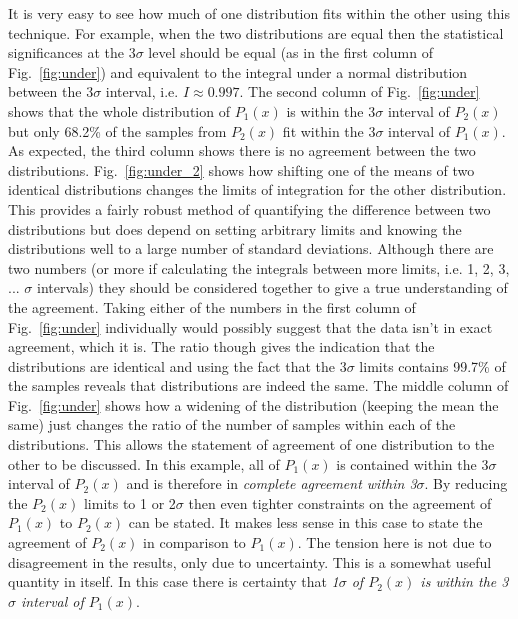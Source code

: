 \documentclass[twocolumn]{revtex4-1}
\begin{document}
    \noindent It is very easy to see how much of one distribution fits within the other using this technique.
    For example, when the two distributions are equal then the statistical significances at the 3$\sigma$ level should be equal (as in the first column of Fig.~\ref{fig:under}) and equivalent to the integral under a normal distribution between the 3$\sigma$ interval, i.e. $I\approx0.997$.
    The second column of Fig.~\ref{fig:under} shows that the whole distribution of $P_1(x)$ is within the 3$\sigma$ interval of $P_2(x)$ but only 68.2\% of the samples from $P_2(x)$ fit within the 3$\sigma$ interval of $P_1(x)$.
    As expected, the third column shows there is no agreement between the two distributions.
    Fig.~\ref{fig:under_2} shows how shifting one of the means of two identical distributions changes the limits of integration for the other distribution.
    This provides a fairly robust method of quantifying the difference between two distributions but does depend on setting arbitrary limits and knowing the distributions well to a large number of standard deviations.
    Although there are two numbers (or more if calculating the integrals between more limits, i.e. 1, 2, 3, ... $\sigma$ intervals) they should be considered together to give a true understanding of the agreement.
    Taking either of the numbers in the first column of Fig.~\ref{fig:under} individually would possibly suggest that the data isn't in exact agreement, which it is.
    The ratio though gives the indication that the distributions are identical and using the fact that the $3\sigma$ limits contains 99.7\% of the samples reveals that distributions are indeed the same.
    The middle column of Fig.~\ref{fig:under} shows how a widening of the distribution (keeping the mean the same) just changes the ratio of the number of samples within each of the distributions.
    This allows the statement of agreement of one distribution to the other to be discussed.
    In this example, all of $P_1(x)$ is contained within the 3$\sigma$ interval of $P_2(x)$ and is therefore in \emph{complete agreement within 3$\sigma$}.
    By reducing the $P_2(x)$ limits to 1 or 2$\sigma$ then even tighter constraints on the agreement of $P_1(x)$ to $P_2(x)$ can be stated.
    It makes less sense in this case to state the agreement of $P_2(x)$ in comparison to $P_1(x)$.
    The tension here is not due to disagreement in the results, only due to uncertainty.
    This is a somewhat useful quantity in itself.
    In this case there is certainty that \emph{1$\sigma$ of $P_2(x)$ is within the 3$\sigma$ interval of $P_1(x)$}.
\end{document}

